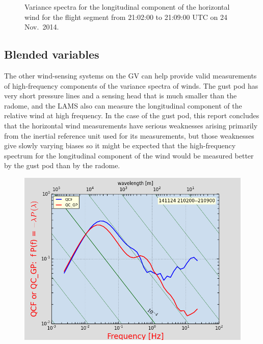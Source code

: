 \documentclass[12pt,twoside,english]{article}\usepackage[]{graphicx}\usepackage[]{color}
\let\OrgIndex\index
\renewcommand*{\index}[1]{\OrgIndex{#1}}
\begin{document}
{{\begin{figure}
\protect\protect\protect\caption{\label{fig:AppxB-PSD6}Variance spectra for the longitudinal component of the horizontal wind for the flight segment from 21:02:00 to 21:09:00 UTC on 24 Nov.\ 2014.} 
\end{figure}

\subsection{\textquotedbl{}Blended\textquotedbl{} variables}

The other wind-sensing systems on the GV can help provide valid measurements of high-frequency components of the variance spectra of winds. The gust pod has very short pressure lines and a sensing head that is much smaller than the radome, and the LAMS also can measure the longitudinal component of the relative wind at high frequency. In the case of the gust pod, this report concludes that the horizontal wind measurements have serious weaknesses arising primarily from the inertial reference unit used for its measurements, but those weaknesses give slowly varying biases so it might be expected that the high-frequency spectrum for the longitudinal component of the wind would be measured better by the gust pod than by the radome. 


\begin{figure}
\noindent \begin{centering}
\includegraphics[height=0.4\textheight]{SpecialGraphics/MEMPlotQC.png}  
\par\end{centering}


\end{figure}}}
\end{document}
